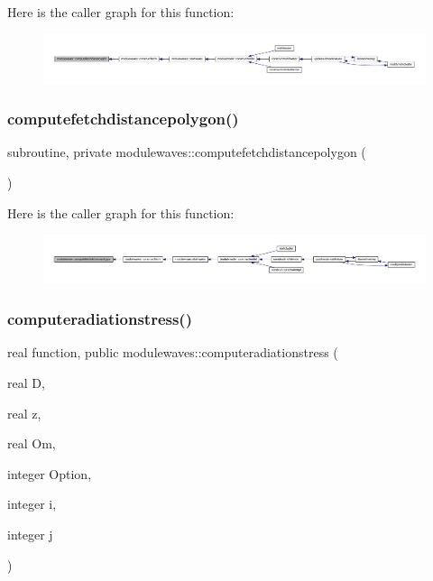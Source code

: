 Here is the caller graph for this function\+:\nopagebreak
\begin{figure}[H]
\begin{center}
\leavevmode
\includegraphics[width=350pt]{namespacemodulewaves_a945cce4a681b204911670731bf66725a_icgraph}
\end{center}
\end{figure}
\mbox{\label{namespacemodulewaves_aae4352dfe2bb084d6d5d956c1bdadea3}} 
\subsubsection{\texorpdfstring{computefetchdistancepolygon()}{computefetchdistancepolygon()}}
{\footnotesize\ttfamily subroutine, private modulewaves\+::computefetchdistancepolygon (\begin{DoxyParamCaption}{ }\end{DoxyParamCaption})\hspace{0.3cm}{\ttfamily [private]}}

Here is the caller graph for this function\+:\nopagebreak
\begin{figure}[H]
\begin{center}
\leavevmode
\includegraphics[width=350pt]{namespacemodulewaves_aae4352dfe2bb084d6d5d956c1bdadea3_icgraph}
\end{center}
\end{figure}
\mbox{\label{namespacemodulewaves_a5f64bacf936301755ac7472613db2a12}} 
\subsubsection{\texorpdfstring{computeradiationstress()}{computeradiationstress()}}
{\footnotesize\ttfamily real function, public modulewaves\+::computeradiationstress (\begin{DoxyParamCaption}\item[{real}]{D,  }\item[{real}]{z,  }\item[{real}]{Om,  }\item[{integer}]{Option,  }\item[{integer}]{i,  }\item[{integer}]{j }\end{DoxyParamCaption})}

